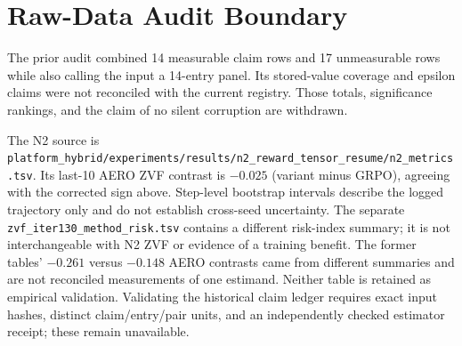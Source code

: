 \section{Raw-Data Audit Boundary}
\label{sec:p6-iter190-raw-recompute}
The prior audit combined 14 measurable claim rows and 17 unmeasurable rows
while also calling the input a 14-entry panel. Its stored-value coverage and
epsilon claims were not reconciled with the current registry. Those totals,
significance rankings, and the claim of no silent corruption are withdrawn.

The N2 source is
\nolinkurl{platform_hybrid/experiments/results/n2_reward_tensor_resume/n2_metrics.tsv}.
Its last-10 AERO ZVF contrast is $-0.025$ (variant minus GRPO), agreeing with
the corrected sign above. Step-level bootstrap intervals describe the logged
trajectory only and do not establish cross-seed uncertainty. The separate
\nolinkurl{zvf_iter130_method_risk.tsv} contains a different risk-index
summary; it is not interchangeable with N2 ZVF or evidence of a training
benefit. The former tables' $-0.261$ versus $-0.148$ AERO contrasts came from
different summaries and are not reconciled measurements of one estimand.
Neither table is retained as empirical validation. Validating the historical
claim ledger requires exact input hashes, distinct claim/entry/pair units,
and an independently checked estimator receipt; these remain unavailable.